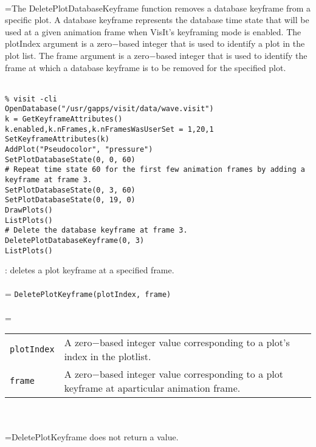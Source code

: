 \documentclass[10pt,a4paper]{report}
\begin{document}
 \\ 
\hangindent=\parindent The DeletePlotDatabaseKeyframe function removes a database keyframe from a specific plot. A database keyframe represents the database time state that will be used at a given animation frame when VisIt's keyframing mode is enabled. The plotIndex argument is a zero$-$based integer that is used to identify a plot in the plot list. The frame argument is a zero$-$based integer that is used to identify the frame at which a database keyframe is to be removed for the specified plot. \\[-3mm] 

\\[-6mm]
\begin{verbatim}% visit -cli
OpenDatabase("/usr/gapps/visit/data/wave.visit")
k = GetKeyframeAttributes()
k.enabled,k.nFrames,k.nFramesWasUserSet = 1,20,1
SetKeyframeAttributes(k)
AddPlot("Pseudocolor", "pressure")
SetPlotDatabaseState(0, 0, 60)
# Repeat time state 60 for the first few animation frames by adding a
keyframe at frame 3.
SetPlotDatabaseState(0, 3, 60)
SetPlotDatabaseState(0, 19, 0)
DrawPlots()
ListPlots()
# Delete the database keyframe at frame 3.
DeletePlotDatabaseKeyframe(0, 3)
ListPlots()
\end{verbatim}
\newpage


{}
: deletes a plot keyframe at a specified frame.\\[-3mm]

 \\ 
\hangindent=\parindent 
\verb!DeletePlotKeyframe(plotIndex, frame)!\\ [-3mm]

 \\ 
\hangindent=\parindent 
\begin{tabular}{lp{9cm}}
\verb!plotIndex! & A zero$-$based integer value corresponding to a plot's index in the plotlist. \\
\verb!frame! & A zero$-$based integer value corresponding to a plot keyframe at aparticular animation frame. \\
\end{tabular} \\[-2mm]


 \\ 
\hangindent=\parindent DeletePlotKeyframe does not return a value. \\[-3mm] 
\end{document}
